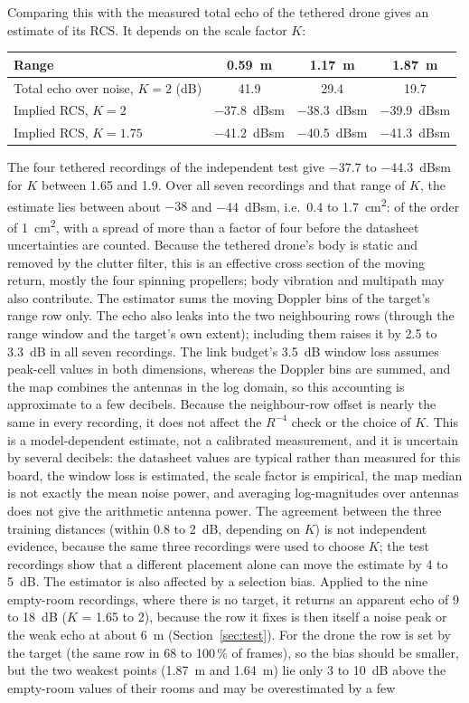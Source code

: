 \documentclass[11pt,a4paper]{article}
\begin{document}
Comparing this with the measured total echo of the tethered drone gives an estimate of its RCS. It depends on the scale factor $K$:
\begin{center}\small
\begin{tabular}{@{}lccc@{}}\toprule
Range & \SI{0.59}{m} & \SI{1.17}{m} & \SI{1.87}{m}\\\midrule
Total echo over noise, $K=2$ (dB) & 41.9 & 29.4 & 19.7\\
Implied RCS, $K=2$ & \SI{-37.8}{dBsm} & \SI{-38.3}{dBsm} & \SI{-39.9}{dBsm}\\
Implied RCS, $K=1.75$ & \SI{-41.2}{dBsm} & \SI{-40.5}{dBsm} & \SI{-41.3}{dBsm}\\\bottomrule
\end{tabular}
\end{center}
The four tethered recordings of the independent test give $-37.7$ to \SI{-44.3}{dBsm} for $K$ between 1.65 and 1.9. Over all seven recordings and that range of $K$, the estimate lies between about $-38$ and \SI{-44}{dBsm}, i.e.\ 0.4 to \SI{1.7}{cm^2}: of the order of \SI{1}{cm^2}, with a spread of more than a factor of four before the datasheet uncertainties are counted. Because the tethered drone's body is static and removed by the clutter filter, this is an effective cross section of the moving return, mostly the four spinning propellers; body vibration and multipath may also contribute. The estimator sums the moving Doppler bins of the target's range row only. The echo also leaks into the two neighbouring rows (through the range window and the target's own extent); including them raises it by 2.5 to \SI{3.3}{dB} in all seven recordings. The link budget's \SI{3.5}{dB} window loss assumes peak-cell values in both dimensions, whereas the Doppler bins are summed, and the map combines the antennas in the log domain, so this accounting is approximate to a few decibels. Because the neighbour-row offset is nearly the same in every recording, it does not affect the $R^{-4}$ check or the choice of $K$. This is a model-dependent estimate, not a calibrated measurement, and it is uncertain by several decibels: the datasheet values are typical rather than measured for this board, the window loss is estimated, the scale factor is empirical, the map median is not exactly the mean noise power, and averaging log-magnitudes over antennas does not give the arithmetic antenna power. The agreement between the three training distances (within 0.8 to \SI{2}{dB}, depending on $K$) is not independent evidence, because the same three recordings were used to choose $K$; the test recordings show that a different placement alone can move the estimate by 4 to \SI{5}{dB}. The estimator is also affected by a selection bias. Applied to the nine empty-room recordings, where there is no target, it returns an apparent echo of 9 to \SI{18}{dB} ($K$ = 1.65 to 2), because the row it fixes is then itself a noise peak or the weak echo at about \SI{6}{m} (Section~\ref{sec:test}). For the drone the row is set by the target (the same row in 68 to 100\,\% of frames), so the bias should be smaller, but the two weakest points (\SI{1.87}{m} and \SI{1.64}{m}) lie only 3 to \SI{10}{dB} above the empty-room values of their rooms and may be overestimated by a few 
\end{document}
